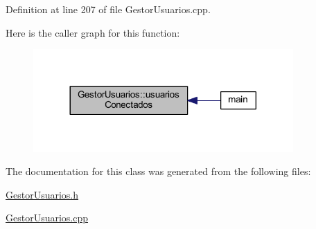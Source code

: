 Definition at line 207 of file Gestor\+Usuarios.\+cpp.



Here is the caller graph for this function\+:\nopagebreak
\begin{figure}[H]
\begin{center}
\leavevmode
\includegraphics[width=281pt]{class_gestor_usuarios_a2a20b4c548e4bbe113174a416873194a_icgraph}
\end{center}
\end{figure}




The documentation for this class was generated from the following files\+:\begin{DoxyCompactItemize}
\item 
\hyperlink{_gestor_usuarios_8h}{Gestor\+Usuarios.\+h}\item 
\hyperlink{_gestor_usuarios_8cpp}{Gestor\+Usuarios.\+cpp}\end{DoxyCompactItemize}
